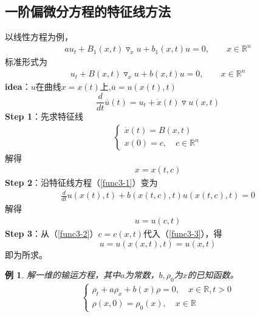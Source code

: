 \documentclass[11pt, a4paper]{article}
\theoremstyle{theorem}
\newtheorem{eg}[thm]{例}
\begin{document}
\subsection{一阶偏微分方程的特征线方法}

以线性方程为例，
\begin{align*}
    a u_t + B_1(x,t) \triangledown_x u + b_1(x, t) u = 0, \quad \quad x \in \mathbb{R}^n
\end{align*}
标准形式为
\begin{align}
\label{func3-1}
    u_t  + B(x,t) \triangledown_x u + b(x,t) u = 0, \quad \quad x \in \mathbb{R}^n
\end{align}
\textbf{idea}：$u$在曲线$x = x(t)$上,$\overline{u} = u(x(t), t)$
$$
\frac{d}{d t} \overline{u}(t) = u_t + \dot{x}(t) \triangledown u (x,t)
$$
\textbf{Step 1}：先求特征线
\begin{align*}
    \begin{cases}
    \dot{x}(t) = B(x,t) \\
    x(0) = c, \quad c \in \mathbb{R}^n
    \end{cases}
\end{align*}
解得
\begin{align}
\label{func3-2}
    x = x(t,c)
\end{align}
\textbf{Step 2}：沿特征线方程（\ref{func3-1}）变为
\begin{align}
\frac{d}{d t} u(x(t),t) + b(x(t,c),t) u(x(t,c),t) = 0
\end{align}
解得
\begin{align}
\label{func3-3}
    u= u(c, t)
\end{align}
\textbf{Step 3}：从（\ref{func3-2}）$c = c(x,t)$代入（\ref{func3-3}），得
$$
u = u(x(x,t), t) = u(x,t)
$$
即为所求。

\begin{eg}
解一维的输运方程，其中$a$为常数，$b, \rho_0$为$x$的已知函数。
\begin{align}
    \begin{cases}
    \rho_t + a \rho_x + b(x) \rho = 0, \quad x \in \mathbb{R}, t > 0 \\
    \rho(x,0) = \rho_0(x), \quad x \in \mathbb{R}
    \end{cases}
\end{align}
\end{eg}
\end{document}
